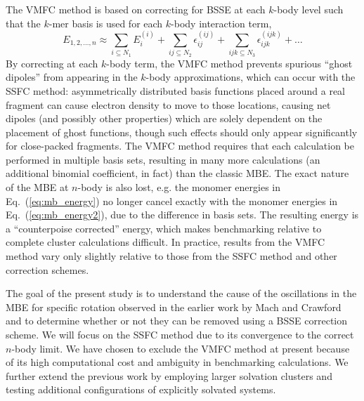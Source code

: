     The VMFC method is based on correcting for BSSE at each $k$-body level such that the $k$-mer basis is used for each $k$-body interaction term,
    \begin{equation} \label{eq:VMFC}
        E_{1,2,\ldots,n} \approx \sum_{i\subseteq N_1}E_{i}^{(i)} + \sum_{ij\subseteq N_2}\epsilon_{ij}^{(ij)} + \sum_{ijk\subseteq N_3}\epsilon_{ijk}^{(ijk)} + \ldots 
    \end{equation}
    By correcting at each $k$-body term, the VMFC method prevents spurious ``ghost dipoles'' from appearing in the $k$-body approximations, which can occur with the SSFC method: asymmetrically distributed basis functions placed around a real fragment can cause electron density to move to those locations, causing net dipoles (and possibly other properties) which are solely dependent on the placement of ghost functions, though such effects should only appear significantly for close-packed fragments. The VMFC method requires that each calculation be performed in multiple basis sets, resulting in many more calculations (an additional binomial coefficient, in fact) than the classic MBE. The exact nature of the MBE at $n$-body is also lost, e.g. the monomer energies in Eq.~(\ref{eq:mb_energy}) no longer cancel exactly with the monomer energies in Eq.~(\ref{eq:mb_energy2}), due to the difference in basis sets. The resulting energy is a ``counterpoise corrected'' energy, which makes benchmarking relative to complete cluster calculations difficult. In practice, results from the VMFC method vary only slightly relative to those from the SSFC method and other correction schemes\cite{Salvador2003,Richard2013,Richard2018a}.

  The goal of the present study is to understand the cause of the oscillations in the MBE for specific rotation observed in the earlier work by Mach and Crawford\cite{Mach2014} and to determine whether or not they can be removed using a BSSE correction scheme.  We will focus on the SSFC method due to its convergence to the correct $n$-body limit.  We have chosen to exclude the VMFC method at present because of its high computational cost and ambiguity in benchmarking calculations.  We further extend the previous work by employing larger solvation clusters and testing additional configurations of explicitly solvated systems.

